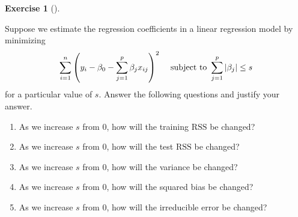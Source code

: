 \documentclass[
  english,
]{article}
\providecommand{\tightlist}{%
  \setlength{\itemsep}{0pt}\setlength{\parskip}{0pt}}
\newcommand{\rss}{\mathrm{RSS}}
\theoremstyle{definition}
\theoremstyle{definition}
\newtheorem{exercise}{Exercise}[section]
\theoremstyle{remark}
\begin{document}
\begin{exercise}[]\protect\hypertarget{exr-}{}\label{exr-}

Suppose we estimate the regression coefficients in a linear regression
model by minimizing \[
\sum_{i=1}^n\qty(y_i-\beta_0-\sum_{j=1}^p\beta_jx_{ij})^2\quad \text{ subject to }\sum_{j=1}^p\abs{\beta_j}\leq s
\] for a particular value of \(s\). Answer the following questions and
justify your answer.

\begin{enumerate}
\def\labelenumi{\alph{enumi}.}
\tightlist
\item
  As we increase \(s\) from \(0\), how will the training \(\rss\) be
  changed?
\item
  As we increase \(s\) from \(0\), how will the test \(\rss\) be
  changed?
\item
  As we increase \(s\) from \(0\), how will the variance be changed?
\item
  As we increase \(s\) from \(0\), how will the squared bias be changed?
\item
  As we increase \(s\) from \(0\), how will the irreducible error be
  changed?
\end{enumerate}

\end{exercise}
\end{document}
